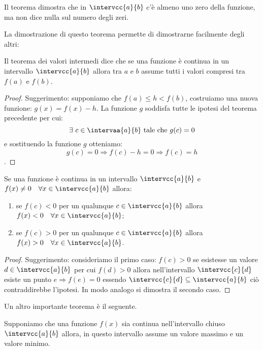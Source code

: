 Il teorema dimostra che in \(\intervcc{a}{b}\) c'è almeno uno zero della 
funzione, ma non dice nulla sul numero degli zeri.

La dimostrazione di questo teorema permette di dimostrarne facilmente degli 
altri: 

\begin{corollario}
Il teorema dei valori intermedi dice che se una funzione è continua in un
intervallo \(\intervcc{a}{b}\) allora tra \(a\) e \(b\) assume tutti i valori 
compresi tra \(f(a)\) e \(f(b)\).
\end{corollario}

\begin{proof}
Suggerimento: 
supponiamo che \(f(a) \leqslant h < f(b)\), 
costruiamo una nuova funzione: \(g(x)=f(x)-h\).
La funzione \(g\) soddisfa tutte le ipotesi del teorema precedente per cui:
\[\exists~c \in \intervaa{a}{b} \text{ tale che } g(c)=0\]
e sostituendo la funzione \(g\) otteniamo:
\[g(c)=0 \Rightarrow f(c)-h=0 \Rightarrow f(c)=h\].
\end{proof}

\begin{corollario}
Se una funzione è continua in un
intervallo \(\intervcc{a}{b}\) e 
\(f(x)\neq 0 \quad \forall x \in \intervcc{a}{b}\) 
allora:
\begin{enumerate}[nosep]
 \item se \(f(c)<0\) \quad per un qualunque \quad \(c \in \intervcc{a}{b}\)
 \quad allora \quad \(f(x)<0 \quad \forall x \in \intervcc{a}{b}\);
 \item se \(f(c)>0\) \quad per un qualunque \quad \(c \in \intervcc{a}{b}\)
 \quad allora \quad \(f(x)>0 \quad \forall x \in \intervcc{a}{b}\).
\end{enumerate}
\end{corollario}

\begin{proof}
Suggerimento: 
consideriamo il primo caso: \(f(c)>0\) 
se esistesse un valore \(d \in \intervcc{a}{b}\) per cui
\(f(d)>0\) allora nell'intervallo \(\intervcc{c}{d}\) 
esiste un punto \(e \Rightarrow f(e)=0\)
essendo \(\intervcc{c}{d} \subseteq \intervcc{a}{b}\) 
ciò contraddirebbe l'ipotesi.
In modo analogo si dimostra il secondo caso.
\end{proof}

Un altro importante teorema è il seguente.

\begin{teorema}
Supponiamo che una funzione \(f(x)\) sia continua nell'intervallo chiuso
\(\intervcc{a}{b}\) allora, in questo intervallo assume un valore massimo e un 
valore minimo.
\end{teorema}

